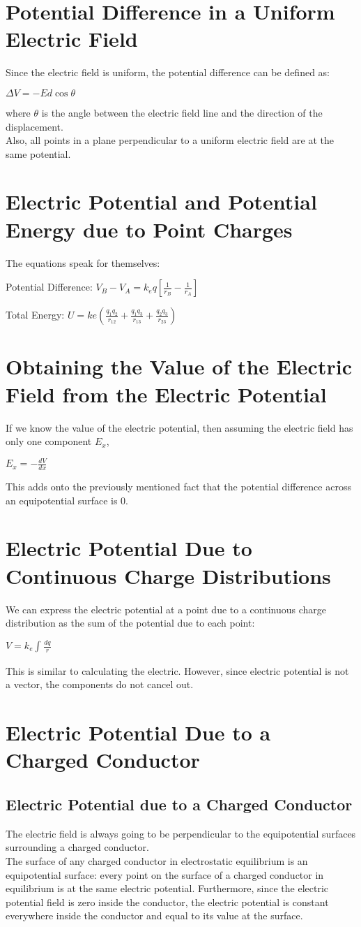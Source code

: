 \documentclass{report}
\begin{document}
	\section{Potential Difference in a Uniform Electric Field}
		Since the electric field is uniform, the potential difference can be defined as:\\
		\centerline{$\Delta V = -Ed\cos \theta$}
		where $\theta$ is the angle between the electric field line and the direction of the displacement.\\
		Also, all points in a plane perpendicular to a uniform electric field are at the same potential.
	\section{Electric Potential and Potential Energy due to Point Charges}
		The equations speak for themselves:\\
		\centerline{Potential Difference: $V_B - V_A = k_e q[\frac{1}{r_B} - \frac{1}{r_A}]$}
		\centerline{Total Energy: $U = ke(\frac{q_1q_2}{r_{12}} + \frac{q_1q_3}{r_{13}} + \frac{q_2q_3}{r_{23}})$}
	\section{Obtaining the Value of the Electric Field from the Electric Potential}
		If we know the value of the electric potential, then assuming the electric field has only one component $E_x$, \\
		\centerline{$E_x = -\frac{dV}{dx}$}
		This adds onto the previously mentioned fact that the potential difference across an equipotential surface is 0.
	\section{Electric Potential Due to Continuous Charge Distributions}
		We can express the electric potential at a point due to a continuous charge distribution as the sum of the potential due to each point:\\
		\centerline{$V = k_e \int_{}^{} \frac{dq}{r}$}
		This is similar to calculating the electric. However, since electric potential is not a vector, the components do not cancel out.
	\section{Electric Potential Due to a Charged Conductor}
		\subsection{Electric Potential due to a Charged Conductor}
			The electric field is always going to be perpendicular to the equipotential surfaces surrounding a charged conductor.\\
			The surface of any charged conductor in electrostatic equilibrium is an equipotential surface: every point on the surface of a charged conductor in equilibrium is at the same electric potential. Furthermore, since the electric potential field is zero inside the conductor, the electric potential is constant everywhere inside the conductor and equal to its value at the surface.
\end{document}
